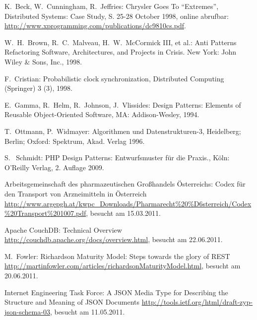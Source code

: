 \begin{thebibliography}{99}

	K.\ Beck, W.\ Cunningham, R.\ Jeffries:
	Chrysler Goes To ``Extremes'',
	Distributed Systems: Case Study, S. 25-28 October 1998,
	online abrufbar: \url{http://www.xprogramming.com/publications/dc9810cs.pdf}.

  W.\ H.\ Brown, R.\ C.\ Malveau, H.\ W.\ McCormick III, et al.:
    Anti Patterns Refactoring Software, Architectures, and Projects in Crisis.
    New York: John Wiley \& Sons, Inc., 1998.

	F.\ Cristian:
	Probabilistic clock synchronization,
	Distributed Computing (Springer) 3 (3), 1998.

  E.\ Gamma, R.\ Helm, R.\ Johnson, J.\ Vlissides:
    Design Patterns: Elements of Reusable Object-Oriented Software,
	MA: Addison-Wesley, 1994.
	
  T.\ Ottmann, P.\ Widmayer:
	Algorithmen und Datenstrukturen-3,
	Heidelberg; Berlin; Oxford: Spektrum, Akad. Verlag 1996.

  S. \ Schmidt:
	PHP Design Patterns: Entwurfsmuster für die Praxis.,
	Köln: O'Reilly Verlag, 2. Auflage 2009.


\hspace{-\leftmargin}{\Large\bfseries Web-Referenzen} %

	Arbeitsgemeinschaft des pharmazeutischen Großhandels Österreichs:
	Codex für den Transport von Arzneimitteln in Österreich
	\url{http://www.argepgh.at/kwpc_Downloads/Pharmarecht%20%D6sterreich/Codex%20Transport%201007.pdf},
	besucht am 15.03.2011.

	Apache CouchDB:
	Technical Overview
	\url{http://couchdb.apache.org/docs/overview.html},
	besucht am 22.06.2011.

	M.\ Fowler:
	Richardson Maturity Model: Steps towards the glory of REST
	\url{http://martinfowler.com/articles/richardsonMaturityModel.html},
	besucht am 20.06.2011.
	
	Internet Engineering Task Force:
	A JSON Media Type for Describing the Structure and Meaning of JSON Documents
	\url{http://tools.ietf.org/html/draft-zyp-json-schema-03},
	besucht am 11.05.2011.


\end{thebibliography}
